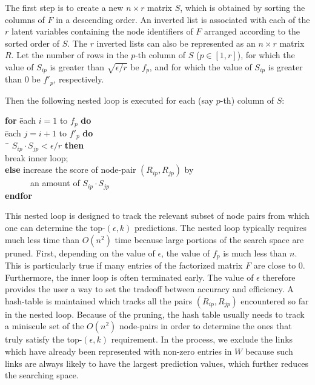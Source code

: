 \documentclass[10pt,journal,compsoc]{IEEEtran}
\begin{document}
The first step is to create a new $n \times r$ matrix $S$, which is
obtained by sorting the columns of $F$ in a descending order. An inverted list is
associated with each of the $r$ latent variables containing the node
identifiers  of $F$ arranged according to the sorted order of $S$. The
$r$ inverted lists can also be represented as an $n \times r$ matrix
$R$. Let the number of rows in the $p$-th column of $S$ ($p\in[1, r]$), for which
the value of $S_{ip}$ is greater than $\sqrt{\epsilon/r}$ be $f_p$, and for which the value of $S_{ip}$ is greater than 0 be $f'_p$, respectively.

Then the following nested loop is executed for each (say $p$-th) column of $S$:

\vspace{-1ex}
\begin{tabbing}\hspace{5ex}\=
{\bf for} \= each $i=1$ to $f_p$ {\bf do}\\
\> \= each $j=i+1$ to $f'_p$ {\bf do}\\
\>\>\ \= $S_{ip} \cdot S_{jp} < \epsilon/r$ {\bf then}\\
\>\>\>\>break inner loop; \\
\>\>\> {\bf else} increase the score of node-pair $(R_{ip}, R_{jp})$
by \\
\>\>\> \ \ \ \ \ \ an amount of $S_{ip} \cdot S_{jp}$\\
\>\> {\bf endfor}\\
\end{tabbing}
\vspace{-1ex}

This nested loop is designed to track the relevant subset of node
pairs from which one can determine the top-$(\epsilon, k)$
predictions.  The nested loop typically requires much less time than
$O(n^2)$ time because large portions of the search space are pruned.
First, depending on the value of $\epsilon$, the value of $f_p$ is
much less than $n$.  This is particularly true if many entries of
the factorized matrix $F$ are close to 0.  Furthermore, the inner
loop is often terminated early. The value of $\epsilon$ therefore
provides the user a way to set the tradeoff between accuracy and
efficiency. A hash-table is maintained which tracks all the pairs
$(R_{ip}, R_{jp})$ encountered so far in the nested loop. Because of
the pruning, the hash table usually needs to track a miniscule set
of the $O(n^2)$ node-pairs in order to determine the ones that truly satisfy the top-$(\epsilon, k)$ requirement. In the process, we exclude
the links which have already been represented with non-zero entries in $W$
because such links are always likely to have the largest prediction values,
which further reduces the searching space.
\end{document}
